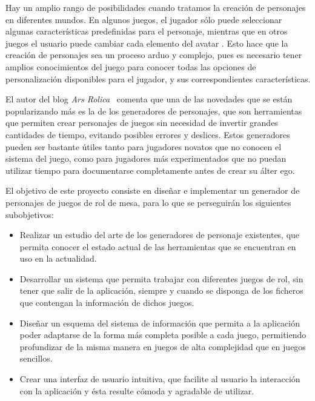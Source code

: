 Hay un amplio rango de posibilidades cuando tratamos la creación de personajes en diferentes mundos. En algunos juegos, el jugador 
sólo puede seleccionar algunas características predefinidas para el personaje, mientras que en otros juegos el usuario puede cambiar cada
elemento del avatar \autocite*{Isaksson2012}. Esto hace que la creación de personajes sea un proceso arduo y complejo, pues es necesario 
tener amplios conocimientos del juego para conocer todas las opciones de personalización disponibles para el jugador, y sus correspondientes 
características. \medskip

El autor del blog \textit{Ars Rolica}~\autocite*{ArsRolica} comenta que una de las novedades que se están popularizando más es la de los 
generadores de personajes, que son herramientas que permiten crear personajes de juegos sin necesidad de invertir grandes cantidades 
de tiempo, evitando posibles errores y deslices. Estos generadores pueden ser bastante útiles tanto para jugadores novatos que no 
conocen el sistema del juego, como para jugadores más experimentados que no puedan utilizar tiempo para documentarse completamente 
antes de crear su álter ego. \medskip

El objetivo de este proyecto consiste en diseñar e implementar un generador de personajes de juegos de rol de mesa, para lo que se 
perseguirán los siguientes subobjetivos:
\begin{itemize}

    \item Realizar un estudio del arte de los generadores de personaje existentes, que permita conocer el estado actual de las herramientas
    que se encuentran en uso en la actualidad.

    \item Desarrollar un sistema que permita trabajar con diferentes juegos de rol, sin tener que salir de la aplicación, siempre y 
    cuando se disponga de los ficheros que contengan la información de dichos juegos.

    \item Diseñar un esquema del sistema de información que permita a la aplicación poder adaptarse de la forma más completa posible a 
    cada juego, permitiendo profundizar de la misma manera en juegos de alta complejidad que en juegos sencillos.

    \item Crear una interfaz de usuario intuitiva, que facilite al usuario la interacción con la aplicación y ésta resulte cómoda y 
    agradable de utilizar.

\end{itemize}







